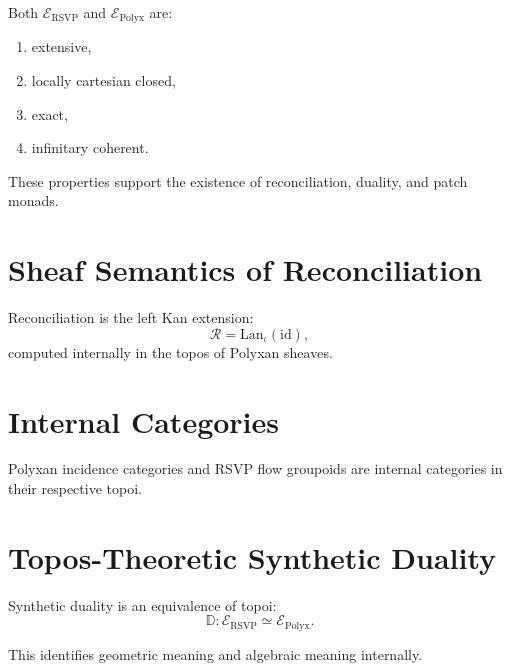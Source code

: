 \begin{proposition}
Both $\mathscr{E}_{\mathrm{RSVP}}$ and $\mathscr{E}_{\mathrm{Polyx}}$ are:
\begin{enumerate}
\item extensive,
\item locally cartesian closed,
\item exact,
\item infinitary coherent.
\end{enumerate}
\end{proposition}

These properties support the existence of reconciliation, duality, and patch monads.

\section{Sheaf Semantics of Reconciliation}

Reconciliation is the left Kan extension:
\[
\mathcal{R} = \mathrm{Lan}_\iota(\mathrm{id}),
\]
computed internally in the topos of Polyxan sheaves.

\section{Internal Categories}

Polyxan incidence categories and RSVP flow groupoids are internal categories in their respective topoi.

\section{Topos-Theoretic Synthetic Duality}

\begin{proposition}
Synthetic duality is an equivalence of topoi:
\[
\mathbb{D} : \mathscr{E}_{\mathrm{RSVP}} \simeq \mathscr{E}_{\mathrm{Polyx}}.
\]
\end{proposition}

This identifies geometric meaning and algebraic meaning internally.


